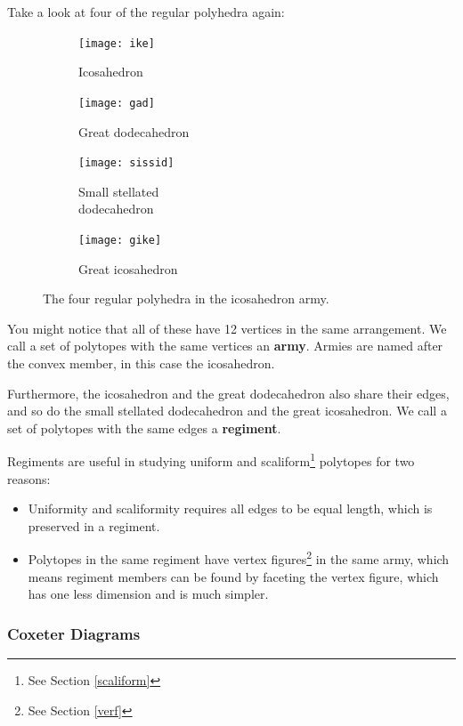 \documentclass{article}
\begin{document}
Take a look at four of the regular polyhedra again:

\begin{figure}[H]
  \centering
  \begin{subfigure}{.25\textwidth}
    \centering
    \texttt{[image: ike]}
    \caption{Icosahedron}
  \end{subfigure}%
  \begin{subfigure}{.25\textwidth}
    \centering
    \texttt{[image: gad]}
    \caption{Great dodecahedron}
  \end{subfigure}%
  \begin{subfigure}{.25\textwidth}
    \centering
    \texttt{[image: sissid]}
    \caption{Small stellated\\dodecahedron}
  \end{subfigure}%
  \begin{subfigure}{.25\textwidth}
    \centering
    \texttt{[image: gike]}
    \caption{Great icosahedron}
  \end{subfigure}%
  \caption{The four regular polyhedra in the icosahedron army.}
  \label{fig:ike_army}
\end{figure}

You might notice that all of these have 12 vertices in the same arrangement. We call a set of polytopes
with the same vertices an \textbf{army}. Armies are named after the convex member, in this case the
icosahedron.

Furthermore, the icosahedron and the great dodecahedron also share their edges, and so do the
small stellated dodecahedron and the great icosahedron. We call a set of polytopes with the same edges
a \textbf{regiment}.

Regiments are useful in studying uniform and scaliform\footnote{See Section \ref{scaliform}} 
polytopes for two reasons:
\begin{itemize}
  \item Uniformity and scaliformity requires all edges to be equal length, which is 
  preserved in a regiment.
  \item Polytopes in the same regiment have vertex figures\footnote{See Section \ref{verf}}
  in the same army, which means regiment members can be found by faceting the vertex
  figure, which has one less dimension and is much simpler.
\end{itemize}

\subsubsection{Coxeter Diagrams}
\end{document}
